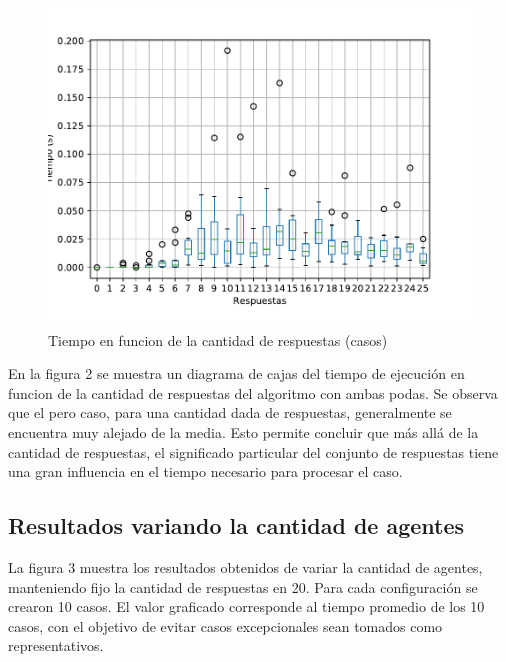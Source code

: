 \documentclass{article}
\begin{document}
\begin{figure}[h]
\caption{Tiempo en funcion de la cantidad de respuestas (casos)}
\centering
\includegraphics[scale=0.5]{Respuestas_box_st.pdf}
\end{figure}

En la figura 2 se muestra un diagrama de cajas del tiempo de ejecución en funcion de la cantidad de respuestas del algoritmo con ambas podas. Se observa que el pero caso, para una cantidad dada de respuestas, generalmente se encuentra muy alejado de la media. Esto permite concluir que más allá de la cantidad de respuestas, el significado particular del conjunto de respuestas tiene una gran influencia en el tiempo necesario para procesar el caso.

\subsection{Resultados variando la cantidad de agentes}

La figura 3 muestra los resultados obtenidos de variar la cantidad de agentes, manteniendo fijo la cantidad de respuestas en 20. Para cada configuración se crearon 10 casos. El valor graficado corresponde al tiempo promedio de los 10 casos, con el objetivo de evitar casos excepcionales sean tomados como representativos.
\end{document}
